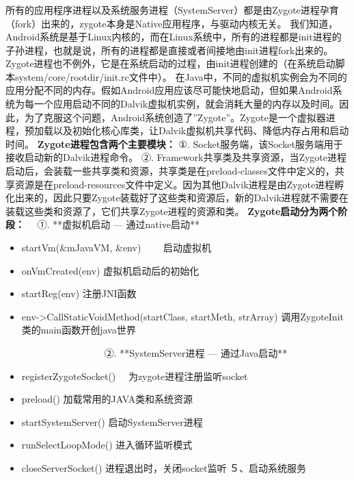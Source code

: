 \documentclass[9pt, b5paper]{article}
\begin{document}
\subsubsection{}
\label{sec-5-0-4}
所有的应用程序进程以及系统服务进程（SystemServer）都是由Zygote进程孕育（fork）出来的，zygote本身是Native应用程序，与驱动内核无关。
我们知道，Android系统是基于Linux内核的，而在Linux系统中，所有的进程都是init进程的子孙进程，也就是说，所有的进程都是直接或者间接地由init进程fork出来的。Zygote进程也不例外，它是在系统启动的过程，由init进程创建的（在系统启动脚本system/core/rootdir/init.rc文件中）。
在Java中，不同的虚拟机实例会为不同的应用分配不同的内存。假如Android应用应该尽可能快地启动，但如果Android系统为每一个应用启动不同的Dalvik虚拟机实例，就会消耗大量的内存以及时间。因此，为了克服这个问题，Android系统创造了”Zygote”。Zygote是一个虚拟器进程，预加载以及初始化核心库类，让Dalvik虚拟机共享代码、降低内存占用和启动时间。
\textbf{\textbf{Zygote进程包含两个主要模块：}}
  ①. Socket服务端，该Socket服务端用于接收启动新的Dalvik进程命令。
  ②. Framework共享类及共享资源，当Zygote进程启动后，会装载一些共享类和资源，共享类是在preload-classes文件中定义的，共享资源是在preload-resources文件中定义。因为其他Dalvik进程是由Zygote进程孵化出来的，因此只要Zygote装载好了这些类和资源后，新的Dalvik进程就不需要在装载这些类和资源了，它们共享Zygote进程的资源和类。
\textbf{\textbf{Zygote启动分为两个阶段：}}
 　①. **虚拟机启动 --- 通过native启动**　
\begin{itemize}
\item startVm(\&mJavaVM, \&env) 　　启动虚拟机　
\item onVmCreated(env)         虚拟机启动后的初始化
\item startReg(env)             注册JNI函数
\item env->CallStaticVoidMethod(startClass, startMeth, strArray) 调用ZygoteInit类的main函数开创java世界　
\end{itemize}
　　　　　　　　　　
 ②. **SystemServer进程 --- 通过Java启动**　
\begin{itemize}
\item registerZygoteSocket() 　为zygote进程注册监听socket
\item preload()            加载常用的JAVA类和系统资源
\item startSystemServer()    启动SystemServer进程
\item runSelectLoopMode()  进入循环监听模式
\item closeServerSocket()    进程退出时，关闭socket监听
５、启动系统服务
\end{itemize}
\end{document}
